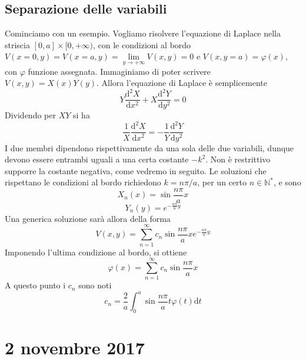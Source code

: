 \documentclass[a4paper,11pt]{book}
\newcommand{\dif}{\mathrm{d}}
\theoremstyle{theorem}
\theoremstyle{definition}
\begin{document}
\subsection{Separazione delle variabili}
Cominciamo con un esempio. Vogliamo risolvere l'equazione di Laplace nella striscia $[0,a]\times[0,+\infty)$, con le condizioni al bordo $V(x=0,y)=V(x=a,y)=\lim\limits_{y\to+\infty}V(x,y)=0$ e $V(x,y=a)=\varphi(x)$, con $\varphi$ funzione assegnata. Immaginiamo di poter scrivere $V(x,y)=X(x)Y(y)$. Allora l'equazione di Laplace è semplicemente
\[Y\frac{\dif^2X}{\dif x^2}+X\frac{\dif^2Y}{\dif y^2}=0\]
Dividendo per $XY$ si ha
\[\frac{1}{X}\frac{\dif^2X}{\dif x^2}=-\frac{1}{Y}\frac{\dif^2Y}{\dif y^2}\]
I due membri dipendono rispettivamente da una sola delle due variabili, dunque devono essere entrambi uguali a una certa costante $-k^2$. Non è restrittivo supporre la costante negativa, come vedremo in seguito. Le soluzioni che rispettano le condizioni al bordo richiedono $k=n\pi/a$, per un certo $n\in\mathbb{N}^*$, e sono
\[X_n(x)=\sin \frac{n\pi}{a}x\]
\[Y_n(y)=e^{-\frac{n\pi}{a}y}\]
Una generica soluzione sarà allora della forma
\[V(x,y)=\sum_{n=1}^{\infty}c_n\sin \frac{n\pi}{a}xe^{-\frac{n\pi}{a}y}\]
Imponendo l'ultima condizione al bordo, si ottiene
\[\varphi(x)=\sum_{n=1}^{\infty}c_n\sin \frac{n\pi}{a}x\]
A questo punto i $c_n$ sono noti
\[c_n=\frac{2}{a}\int_{0}^{a}\sin\frac{n\pi}{a}t\varphi(t)\dif t\]
\newpage
\section{2 novembre 2017}
\end{document}
